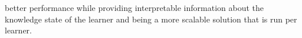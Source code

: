 \documentclass[letterpaper]{article} %
\begin{document}
better performance while providing interpretable information about the knowledge state of the learner and being a more scalable solution that is run per learner.








\end{document}
